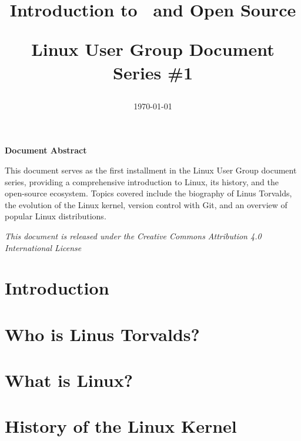 \documentclass[12pt, a4paper, oneside]{article}
\title{
	\vspace{-2cm}
	\begin{flushleft}
		\Huge\bfseries\color{lugblue}
		Introduction to \linux\ and Open Source
	\end{flushleft}
	\vspace{-0.5cm}
	\begin{flushleft}
		\Large\color{lugdark}
		Linux User Group Document Series \#1
	\end{flushleft}
}
\date{\large\today}
\begin{document}
	
	\maketitle
	
	
	\begin{center}
		\colorbox{luglight}{
			\begin{minipage}{0.8\textwidth}
				\centering
				\vspace{0.5cm}
				\Large\textbf{Document Abstract}
				\vspace{0.3cm}
				
				\normalsize
				This document serves as the first installment in the Linux User Group document series, providing a comprehensive introduction to Linux, its history, and the open-source ecosystem. Topics covered include the biography of Linus Torvalds, the evolution of the Linux kernel, version control with Git, and an overview of popular Linux distributions.
				\vspace{0.5cm}
			\end{minipage}
		}
	\end{center}
	
	\vfill
	
	\begin{center}
		\small\textit{This document is released under the Creative Commons Attribution 4.0 International License}
	\end{center}
	
	\newpage
	
	\tableofcontents
	\newpage
	
	
	\section{Introduction}
	
	\section{Who is Linus Torvalds?}
	
	\section{What is Linux?}
	
	\section{History of the Linux Kernel}
		
\end{document}
